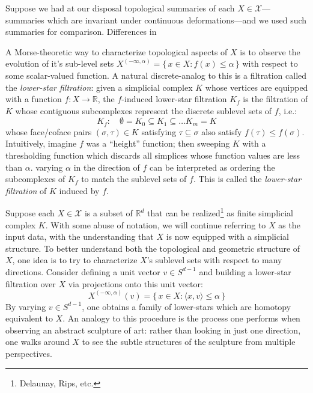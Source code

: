 \documentclass[10pt]{article}
\begin{document}
Suppose we had at our disposal topological summaries of each $X \in \mathcal{X}$---summaries which are invariant under continuous deformations---and we used such summaries for comparison.
Differences in  

A Morse-theoretic way to characterize topological aspects of $X$ is to observe the evolution of it's sub-level sets $X^{(-\infty, \alpha)} = \{\, x \in X : f(x) \leq \alpha \, \}$ with respect to some scalar-valued function. A natural discrete-analog to this is a filtration called the \emph{lower-star filtration}: given a simplicial complex $K$ whose vertices are equipped with a function $f: X \to \mathbb{R}$, the $f$-induced lower-star filtration $K_f$ is the filtration of $K$ whose contiguous subcomplexes represent the discrete sublevel sets of $f$, i.e.:
$$ K_f: \quad \emptyset = K_0 \subseteq K_1 \subseteq \dots K_m = K $$
whose face/coface pairs $(\sigma, \tau) \in K$ satisfying $\tau \subseteq \sigma$ also satisfy $f(\tau) \leq f(\sigma)$. Intuitively, imagine $f$ was a ``height'' function; then sweeping $K$ with a thresholding function which discards all simplices whose function values are less than $\alpha$. varying $\alpha$ in the direction of $f$ can be interpreted as ordering the subcomplexes of $K_f$ to match the sublevel sets of $f$. This is called the \emph{lower-star filtration} of $K$ induced by $f$.


Suppose each $X \in \mathcal{X}$ is a subset of $\mathbb{R}^d$ that can be realized\footnote{Delaunay, Rips, etc.} as finite simplicial complex $K$. With some abuse of notation, we will continue referring to $X$ as the input data, with the understanding that $X$ is now equipped with a simplicial structure. 
To better understand both the topological and geometric structure of $X$, one idea is to try to characterize $X$'s sublevel sets with respect to many directions. Consider defining a unit vector $v \in S^{d-1}$ and building a lower-star filtration over $X$ via projections onto this unit vector:
\begin{equation}
	X^{(-\infty, \alpha)}(v) = \{\, x \in X : \langle x, v \rangle \leq \alpha \,\}
\end{equation} 
By varying $v \in S^{d-1}$, one obtains a family of lower-stars which are homotopy equivalent to $X$.
An analogy to this procedure is the process one performs when observing an abstract sculpture of art: rather than looking in just one direction, one walks around $X$ to see the subtle structures of the sculpture from multiple perspectives.
\end{document}

